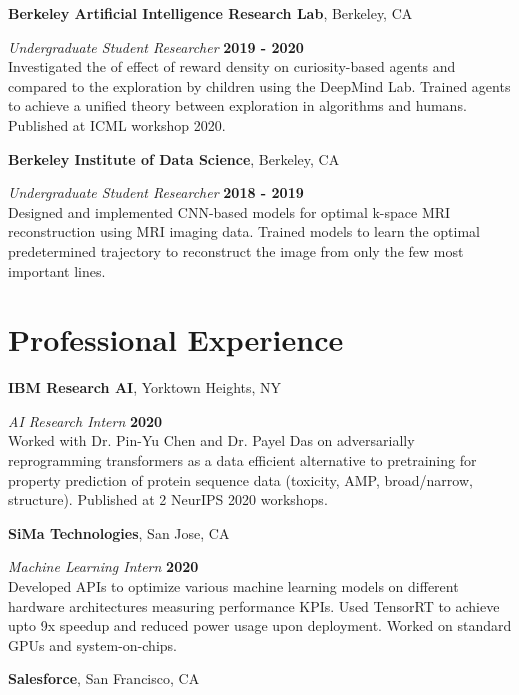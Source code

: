 \documentclass[mm,line]{res}
\begin{document}
\begin{resume}
{\bf Berkeley Artificial Intelligence Research Lab}, Berkeley, CA

\vspace{-.4cm}
{\em Undergraduate Student Researcher} \hfill {\bf 2019 - 2020}\\
Investigated the of effect of reward density on curiosity-based agents and compared to the exploration by children using the DeepMind Lab. Trained agents to achieve a unified theory between exploration in algorithms and humans. Published at ICML workshop 2020.

{\bf Berkeley Institute of Data Science}, Berkeley, CA

\vspace{-.4cm}
{\em Undergraduate Student Researcher} \hfill {\bf 2018 - 2019}\\
Designed and implemented CNN-based models for optimal k-space MRI reconstruction using MRI imaging data. Trained models to learn the optimal predetermined trajectory to reconstruct the image from only the few most important lines. 



\section{\sc Professional Experience}

{\bf IBM Research AI}, Yorktown Heights, NY

\vspace{-.4cm}
{\em AI Research Intern} \hfill {\bf 2020}\\
Worked with Dr. Pin-Yu Chen and Dr. Payel Das on adversarially reprogramming transformers as a data efficient alternative to pretraining for property prediction of protein sequence data (toxicity, AMP, broad/narrow, structure). Published at 2 NeurIPS 2020 workshops.

{\bf SiMa Technologies}, San Jose, CA

\vspace{-.4cm}
{\em Machine Learning Intern} \hfill {\bf 2020}\\
Developed APIs to optimize various machine learning models on different hardware architectures measuring performance KPIs. Used TensorRT to achieve upto 9x speedup and reduced power usage upon deployment. Worked on standard GPUs and system-on-chips.
\hfill {}



{\bf Salesforce}, San Francisco, CA


\end{resume}
\end{document}
